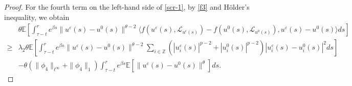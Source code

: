 \documentclass[11pt]{article}
\numberwithin{equation}{section}
\theoremstyle{plain}
\begin{document}
\begin{proof}
 For the fourth term on the left-hand side of \eqref{scr-1},
 by \eqref{f3} and H\"{o}lder's inequality, we obtain
 \begin{align} \label{scr-2}
       &  \theta \mathbb{E}
               \left[ \int_{\tau-t}^{r} e^{\beta s}
                             \| u^{\varepsilon}(s) - u^0(s) \|^{\theta - 2}
                             \langle f(u^{\varepsilon}(s), \mathcal{L}_{u^{\epsilon}(s)}) 
                                          - f(u^0(s), \mathcal{L}_{u^0(s) } ),
                                         u^{\varepsilon}(s) - u^0(s)
                            \rangle ds
               \right]  \nonumber\\
  \ge & \lambda_2 \theta
               \mathbb{E}
                      \left[ \int_{\tau-t}^{r} e^{\beta s}
                                     \| u^{\varepsilon}(s) - u^0(s) \|^{\theta - 2}
                                    \sum_{ i \in \mathbb{Z}} 
   	                                      \left( |u_{i}^{\varepsilon}(s)|^{p-2} + |u_{i}^0(s)|^{p-2} \right)    
   	                                      |u_{i} ^{\varepsilon}(s) - u_{i}^0(s)|^2 
   	                          ds
   	                  \right]  \nonumber\\
   	       & - \theta \left( \|\phi_4\|_{\ell^\infty} +  \|\phi_4\|_1  \right)
   	                    \int_{\tau-t}^{r} e^{\beta s}
   	                        \mathbb{E}
   	                           	   \left[ \| u^{\varepsilon}(s) - u^0(s) \|^{\theta}
   	                               \right]
   	                     ds. 
 \end{align}
 

\end{proof}
\end{document}
